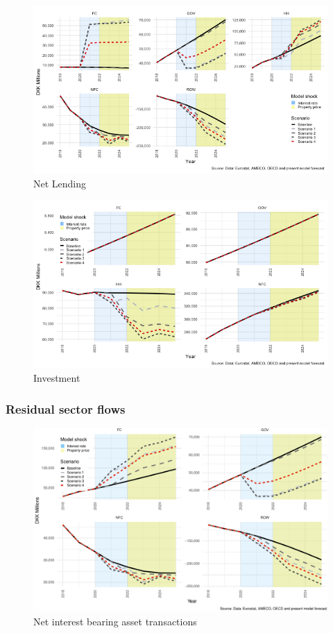 \documentclass[
]{book}
\begin{document}
\begin{figure}[H]
\includegraphics[width=0.95\linewidth]{figures/fl-fi-sfc-Yd-extra-1} \caption{Net Lending}\label{fig:fl-fi-sfc-Yd-extra}
\end{figure}

\begin{figure}[H]
\includegraphics[width=0.95\linewidth]{figures/fl-fi-sfc-INV-extra-1} \caption{Investment}\label{fig:fl-fi-sfc-INV-extra}
\end{figure}

\hypertarget{residual-sector-flows}{%
\subsubsection{Residual sector flows}\label{residual-sector-flows}}

\begin{figure}
\centering
\includegraphics{figures/fl-fi-sfc-NIB-extra-1.pdf}
\caption{\label{fig:fl-fi-sfc-NIB-extra}Net interest bearing asset transactions}
\end{figure}
\end{document}
